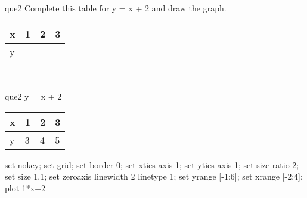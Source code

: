 \documentclass[13.5pt, varwidth=true]{beamer}
\begin{document}
\begin{frame}[shrink=19,fragile]
	\begin{beamercolorbox}[rounded=true, left, shadow=true,wd=14.8cm]{que2}
		 Complete this table for y = x + 2 and draw the graph. \\[0.3cm] \renewcommand{\arraystretch}{1.2}\begin{tabular}{|C|C|C|C|} \hline x & 1 & 2 & 3 \\ \hline y & & & \\ \hline \end{tabular}\\[0.3cm]
	\end{beamercolorbox}
\end{frame}
\begin{frame}[shrink=19,fragile]
	\begin{beamercolorbox}[rounded=true, left, shadow=true,wd=14.8cm]{que2}
		y = x + 2\renewcommand{\arraystretch}{1.2}\begin{tabular}{|C|C|C|C|} \hline x & 1 & 2 & 3 \\ \hline y & 3 & 4 & 5\\ \hline \end{tabular}\begin{gnuplot}[terminal=pdf] set nokey; set grid; set border 0; set xtics axis 1; set ytics axis 1; set size ratio 2; set size 1,1; set zeroaxis linewidth 2 linetype 1; set yrange [-1:6]; set xrange [-2:4]; plot 1*x+2 \end{gnuplot}
	\end{beamercolorbox}
\end{frame}
\end{document}
